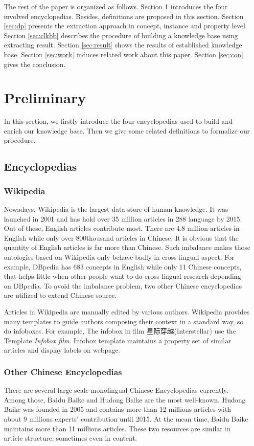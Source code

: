 \documentclass[runningheads,a4paper]{llncs}
\begin{document}
The rest of the paper is organized as follows. Section \ref{sec:pre} introduces the four involved encyclopedias. Besides, definitions are proposed in this section. Section \ref{sec:dp} presents the extraction approach in concept, instance and property level. Section \ref{sec:clkbb} describes the procedure of building a knowledge base using extracting result. Section \ref{sec:result} shows the results of established knowledge base. Section \ref{sec:work} induces related work about this paper. Section \ref{sec:con} gives the conclusion.

\section{Preliminary}
\label{sec:pre}
In this section, we firstly introduce the four encyclopedias used to build and enrich our knowledge base. Then we give some related definitions to formalize our procedure.

\subsection{Encyclopedias}
\label{sec:encyclopedias}
\subsubsection{Wikipedia}
Nowadays, Wikipedia is the largest data store of human knowledge. It was launched in 2001 and has hold over 35 million articles in 288 language by 2015. Out of these, English articles contribute most. There are 4.8 million articles in English while only over 800thousand articles in Chinese. It is obvious that the quantity of English articles is far more than Chinese. Such imbalance makes those ontologies based on Wikipedia-only behave badly in cross-lingual aspect. For example, DBpedia has 683 concepts in English while only 11 Chinese concepts, that helps little when other people want to do cross-lingual research depending on DBpedia. To avoid the imbalance problem, two other Chinese encyclopedias are utilized to extend Chinese source.

Articles in Wikipedia are manually edited by various authors. Wikipedia provides many templates to guide authors composing their context in a standard way, so do infoboxes. For example, The infobox in film 星际穿越(Interstellar) use the Template \emph{Infobox film}. Infobox template maintains a property set of similar articles and display labels on webpage.

\subsubsection{Other Chinese Encyclopedias}
There are several large-scale monolingual Chinese Encyclopedias currently. Among those, Baidu Baike and Hudong Baike are the most well-known. Hudong Baike was founded in 2005 and contains more than 12 millions articles with about 9 millions experts' contribution until 2015. At the mean time, Baidu Baike maintains more than 11 millions articles. These two resources are similar in article structure, sometimes even in content.
\end{document}
